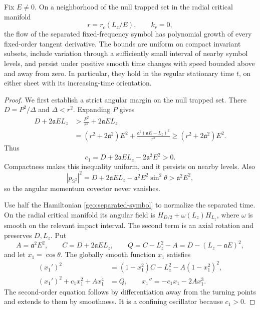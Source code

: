 \begin{lemma}
\label{geo:tangent-growth}
Fix $E\neq0$.  On a neighborhood of the null trapped set in the radial
critical manifold
\[
 r=r_c(L_z/E),\qquad k_r=0,
\]
the flow of the separated fixed-frequency symbol has polynomial
growth of every fixed-order tangent derivative.  The bounds are
uniform on compact invariant subsets, include variation through a
sufficiently small interval of nearby symbol levels, and persist
under positive smooth time changes with speed bounded above and
away from zero.  In particular, they hold in the regular stationary
time $t$, on either sheet with its increasing-time orientation.
\end{lemma}

\begin{proof}
We first establish a strict angular margin on the null trapped set.
There $D=P^2/\Delta$ and $\Delta<r^2$.  Expanding $P$ gives
\begin{equation}
 \begin{aligned}
 D+2\mathfrak a E L_z
 &>\frac{P^2}{r^2}+2\mathfrak a E L_z\\
 &=(r^2+2\mathfrak a^2)E^2
       +\frac{\mathfrak a^2(\mathfrak a E-L_z)^2}{r^2}
  \geq(r^2+2\mathfrak a^2)E^2.
 \end{aligned}
 \label{geo:angular-margin}
\end{equation}
Thus
\begin{equation}
 c_1=D+2\mathfrak a E L_z-2\mathfrak a^2E^2>0.
 \label{geo:oscillator-coefficient}
\end{equation}
Compactness makes this inequality uniform, and it persists on nearby
levels.  Also
\[
 |p_{\mathbb S^2}|^2
  =D+2\mathfrak a E L_z-\mathfrak a^2E^2\sin^2\theta
  >\mathfrak a^2E^2,
\]
so the angular momentum covector never vanishes.

Use half the Hamiltonian \eqref{geo:separated-symbol} to normalize
the separated time.  On the radial critical manifold its angular
field is $H_{D/2}+\omega(L_z)H_{L_z}$, where $\omega$ is smooth
on the relevant impact interval.  The second term is an axial
rotation and preserves $D,L_z$.  Put
\[
 A=\mathfrak a^2E^2,\qquad
 C=D+2\mathfrak a E L_z,\qquad
 Q=C-L_z^2-A=D-(L_z-\mathfrak a E)^2,
\]
and let $x_1=\cos\theta$.  The globally smooth function $x_1$
satisfies
\begin{equation}
 \begin{aligned}
 (x_1')^2&=(1-x_1^2)C-L_z^2-A(1-x_1^2)^2,\\
 (x_1')^2+c_1x_1^2+Ax_1^4&=Q,\qquad
 x_1''=-c_1x_1-2Ax_1^3.
 \end{aligned}
 \label{geo:oscillator}
\end{equation}
The second-order equation follows by differentiation away from the
turning points and extends to them by smoothness.  It is a confining
oscillator because $c_1>0$.


\end{proof}
